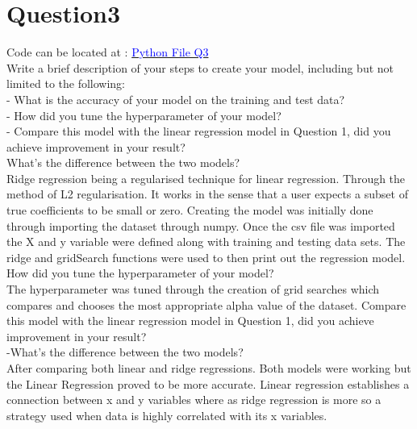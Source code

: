 \documentclass[11pt,a4paper]{scrartcl}
\begin{document}
\newpage
\section{Question3}
Code can be located at :  \href{https://github.com/MS19393924/Assignment-1-Group-9/blob/8bc1cdcf89aecd67f765e19b0435afb995805ea6/Question3}{\textcolor{blue}{Python File Q3}} \\
Write a brief description of your steps to create your model, including but not limited to the following:\\
- What is the accuracy of your model on the training and test data?\\
- How did you tune the hyperparameter of your model? \\
- Compare this model with the linear regression model in Question 1, did you achieve improvement in your result? \\  
What’s the difference between the two models?\\
Ridge regression being a regularised technique for linear regression. Through the method of L2 regularisation. It works in the sense that a user expects a subset of true coefficients to be small or zero. Creating the model was initially done through importing the dataset through numpy. Once the csv file was imported the X and y variable were defined along with training and testing data sets. The ridge and gridSearch functions were used to then print out the regression model. \\
How did you tune the hyperparameter of your model?\\
The hyperparameter was tuned through the creation of grid searches which compares and chooses the most appropriate alpha value of the dataset.
Compare this model with the linear regression model in Question 1, did you achieve improvement in your result?  \\
-What’s the difference between the two models? \\ 
After comparing both linear and ridge regressions. Both models were working but the Linear Regression proved to be more accurate. Linear regression establishes a connection between x and y variables where as ridge regression is more so a strategy used when data is highly correlated with its x variables.
\end{document}
